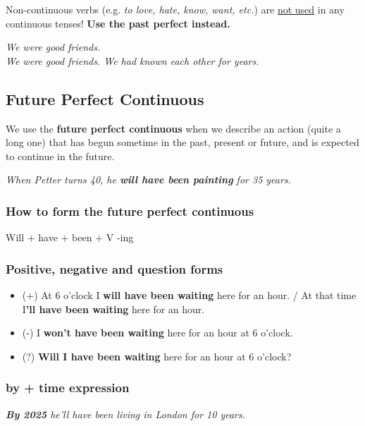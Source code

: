\documentclass[hidelinks,10pt,a4paper]{article}
\begin{document}
Non-continuous verbs (e.g. \textit{to love, hate, know, want, etc.}) are \underline{not used} in any continuous tenses! \textbf{Use the past perfect instead.}

\begin{center}
	\textit{We were good friends. \\
	We were good friends. We had known each other for years.}
\end{center}

\subsection{Future Perfect Continuous}
We use the \textbf{future perfect continuous} when we describe an action (quite a long one) that has begun sometime in the past, present or future, and is expected to continue in the future.

\begin{center}
	\textit{When Petter turns 40, he \textbf{will have been painting} for 35 years.}
\end{center}

\subsubsection{How to form the future perfect continuous}
Will + have + been + V -ing

\subsubsection{Positive, negative and question forms}
\begin{itemize}
	\item (+) At 6 o'clock I \textbf{will have been waiting} here for an hour. / At that time I\textbf{'ll have been waiting} here for an hour.
	\item (-) I \textbf{won't have been waiting} here for an hour at 6 o'clock.
	\item (?) \textbf{Will I have been waiting} here for an hour at 6 o'clock?
\end{itemize}

\subsubsection{by + time expression}
\begin{center}
	\textit{ \textbf{By 2025} he'll have been living in London for 10 years.}
\end{center}
\end{document}
